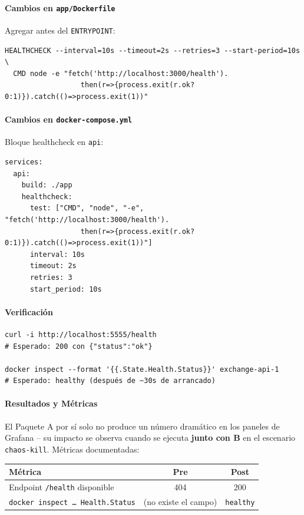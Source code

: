 \paragraph{Cambios en \texttt{app/Dockerfile}} Agregar antes del \texttt{ENTRYPOINT}:

\begin{verbatim}
HEALTHCHECK --interval=10s --timeout=2s --retries=3 --start-period=10s \
  CMD node -e "fetch('http://localhost:3000/health').
                  then(r=>{process.exit(r.ok?0:1)}).catch(()=>process.exit(1))"
\end{verbatim}

\paragraph{Cambios en \texttt{docker-compose.yml}} Bloque healthcheck en \texttt{api}:

\begin{verbatim}
services:
  api:
    build: ./app
    healthcheck:
      test: ["CMD", "node", "-e", "fetch('http://localhost:3000/health').
                  then(r=>{process.exit(r.ok?0:1)}).catch(()=>process.exit(1))"]
      interval: 10s
      timeout: 2s
      retries: 3
      start_period: 10s
\end{verbatim}

\paragraph{Verificación}

\begin{verbatim}
curl -i http://localhost:5555/health
# Esperado: 200 con {"status":"ok"}

docker inspect --format '{{.State.Health.Status}}' exchange-api-1
# Esperado: healthy (después de ~30s de arrancado)
\end{verbatim}

\paragraph{Resultados y Métricas}

El Paquete A por sí solo no produce un número dramático en los paneles de Grafana -- su impacto se observa cuando se ejecuta \textbf{junto con B} en el escenario \texttt{chaos-kill}. Métricas documentadas:

\begin{table}[H]
\centering
\begin{tabular}{lcc}
\toprule
\textbf{Métrica} & \textbf{Pre} & \textbf{Post} \\
\midrule
Endpoint \texttt{/health} disponible & 404 & 200 \\
\texttt{docker inspect … Health.Status} & (no existe el campo) & \texttt{healthy} \\
\bottomrule
\end{tabular}
\end{table}

